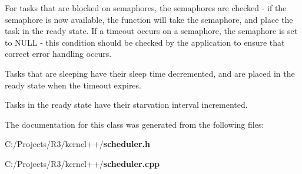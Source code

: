 For tasks that are blocked on semaphores, the semaphores are checked -\/ if the semaphore is now available, the function will take the semaphore, and place the task in the ready state. If a timeout occurs on a semaphore, the semaphore is set to NULL -\/ this condition should be checked by the application to ensure that correct error handling occurs.

Tasks that are sleeping have their sleep time decremented, and are placed in the ready state when the timeout expires.

Tasks in the ready state have their starvation interval incremented. 

The documentation for this class was generated from the following files:\begin{DoxyCompactItemize}
\item 
C:/Projects/R3/kernel++/{\bf scheduler.h}\item 
C:/Projects/R3/kernel++/{\bf scheduler.cpp}\end{DoxyCompactItemize}
